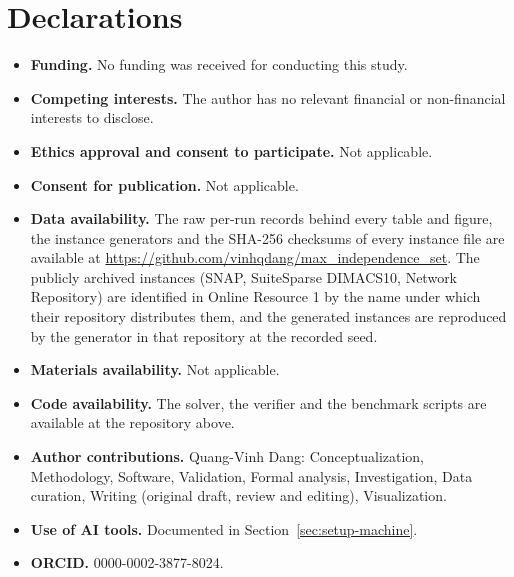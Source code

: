 \documentclass[pdflatex,sn-mathphys-num]{sn-jnl}
\theoremstyle{thmstyleone}%
\theoremstyle{thmstyletwo}%
\begin{document}
\section*{Declarations}

\begin{itemize}
\item \textbf{Funding.} No funding was received for conducting this study.
\item \textbf{Competing interests.} The author has no relevant financial or non-financial interests to disclose.
\item \textbf{Ethics approval and consent to participate.} Not applicable.
\item \textbf{Consent for publication.} Not applicable.
\item \textbf{Data availability.} The raw per-run records behind every table and figure, the instance generators and the SHA-256 checksums of every instance file are available at \url{https://github.com/vinhqdang/max_independence_set}. The publicly archived instances (SNAP, SuiteSparse DIMACS10, Network Repository) are identified in Online Resource 1 by the name under which their repository distributes them, and the generated instances are reproduced by the generator in that repository at the recorded seed.
\item \textbf{Materials availability.} Not applicable.
\item \textbf{Code availability.} The solver, the verifier and the benchmark scripts are available at the repository above.
\item \textbf{Author contributions.} Quang-Vinh Dang: Conceptualization, Methodology, Software, Validation, Formal analysis, Investigation, Data curation, Writing (original draft, review and editing), Visualization.
\item \textbf{Use of AI tools.} Documented in Section~\ref{sec:setup-machine}.
\item \textbf{ORCID.} 0000-0002-3877-8024.
\end{itemize}


\end{document}
